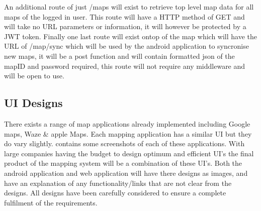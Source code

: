 An additional route of just /maps will exist to retrieve top level map data for all maps of the logged in user. This route will have a HTTP method of GET and will take no URL parameters or information, it will however be protected by a JWT token.
Finally one last route will exist ontop of the map which will have the URL of /map/sync which will be used by the android application to syncronise new maps, it will be a post function and will contain formatted json of the mapID and password required, this route will not require any middleware and will be open to use.

\subsection{UI Designs}
There exists a range of map applications already implemented including Google maps, Waze \& apple Maps. Each mapping application has a similar UI but they do vary slightly. \appendixtemp contains some screenshots of each of these applications. With large companies having the budget to design optimum and efficient UI's the final product of the mapping system will be a combination of these UI's. Both the android application and web application will have there designs as images, and have an explanation of any functionality/links that are not clear from the designs. All designs have been carefully considered to ensure a complete fulfilment of the requirements.

\pagebreak
